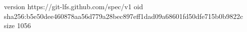 version https://git-lfs.github.com/spec/v1
oid sha256:b5e50dee460878aa56d779a28bec897eff1dad09a68601fd50dfe715b0b9822c
size 1056
